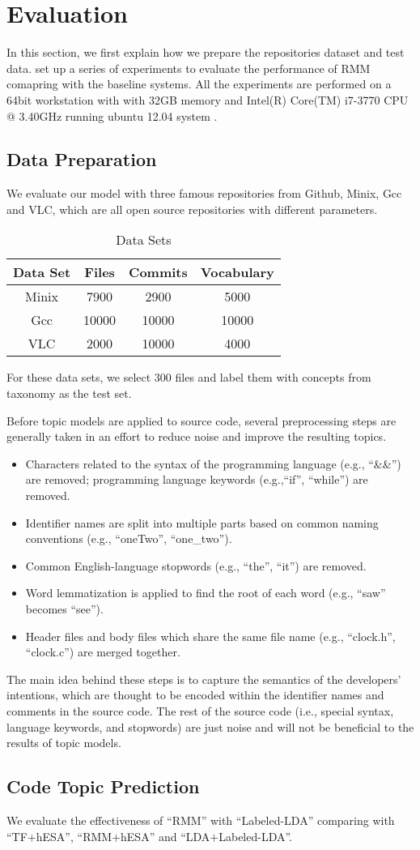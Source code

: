 \section{Evaluation}
\label{sec:eval}
In this section, we first explain how we prepare the repositories dataset and test data.
set up a series of experiments to evaluate the performance of RMM
comapring with the baseline systems. All the experiments are performed on a 64bit workstation
with with 32GB memory and Intel(R) Core(TM) i7-3770 CPU @ 3.40GHz running ubuntu 12.04
system .
\subsection{Data Preparation}
We evaluate our model with three famous repositories from Github, Minix, Gcc and VLC, which are
all open source repositories with different parameters.

\begin{table}[th]
\centering
\begin{tabular}{|c|c|c|c|}
\hline
Data Set & Files & Commits & Vocabulary\\
\hline \hline
Minix& 7900 & 2900 & 5000 \\
Gcc& 10000 & 10000 & 10000 \\
VLC& 2000 & 10000 & 4000 \\
\hline
\end{tabular}
\caption{Data Sets}
\label{tab:data-par}
\end{table}

For these data sets, we select 300 files and label them with concepts from taxonomy as 
the test set.

Before topic models are applied to source code, several preprocessing steps are generally
taken in an effort to reduce noise and improve the resulting topics.
\begin{itemize}
\item Characters related to the syntax of the programming language (e.g., ``\&\&'') are
removed; programming language keywords (e.g.,``if'', ``while'') are removed.
\item Identifier names are split into multiple parts based on common naming conventions
(e.g., ``oneTwo'', ``one\_two'').
\item Common English-language stopwords (e.g., ``the'', ``it'') are removed.
\item Word lemmatization is applied to find the root of each word (e.g., ``saw'' becomes
``see'').
\item Header files and body files which share the same file name (e.g., ``clock.h'', ``clock.c'') are merged together.
\end{itemize}
The main idea behind these steps is to capture the semantics of the developers' intentions, 
which are thought to be encoded within the identifier names and comments in the
source code. The rest of the source code (i.e., special syntax, language keywords,
and stopwords) are just noise and will not be beneficial to the results of topic models.


\subsection{Code Topic Prediction}
We evaluate the effectiveness of ``RMM'' with ``Labeled-LDA''\cite{ramage-EtAl:2009:EMNLP} comparing with ``TF$+$hESA'', ``RMM$+$hESA'' and ``LDA$+$Labeled-LDA''. 


